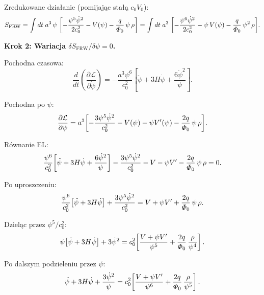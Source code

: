 Zredukowane dzia\l{}anie (pomijaj\k{a}c sta\l{}\k{a} $c_0 V_0$):
\begin{equation}\label{eq:S-FRW-reduced}
  S_{\mathrm{FRW}}
  = \int dt\;a^3\,\psi\;\biggl[
    -\frac{\psi^5\dot\psi^2}{2c_0^2}
    - V(\psi)
    - \frac{q}{\varPhi_0}\,\psi\,\rho
  \biggr]
  = \int dt\;a^3\;\biggl[
    -\frac{\psi^6\dot\psi^2}{2c_0^2}
    - \psi\,V(\psi)
    - \frac{q}{\varPhi_0}\,\psi^2\,\rho
  \biggr].
\end{equation}

\textbf{Krok 2: Wariacja $\delta S_{\mathrm{FRW}}/\delta\psi = 0$.}

Pochodna czasowa:
\begin{equation}\label{eq:ddt-pdotpsi}
  \frac{d}{dt}\!\left(\frac{\partial\mathcal{L}}{\partial\dot\psi}\right)
  = -\frac{a^3\psi^6}{c_0^2}
  \left[\ddot\psi + 3H\dot\psi + \frac{6\dot\psi^2}{\psi}\right].
\end{equation}

Pochodna po $\psi$:
\begin{equation}\label{eq:dpsi-direct}
  \frac{\partial\mathcal{L}}{\partial\psi}
  = a^3\biggl[
    -\frac{3\psi^5\dot\psi^2}{c_0^2}
    - V(\psi) - \psi V'(\psi)
    - \frac{2q}{\varPhi_0}\,\psi\,\rho
  \biggr].
\end{equation}

R\'ownanie EL:
\begin{equation}\label{eq:EL-FRW-full}
  \frac{\psi^6}{c_0^2}\!\left[\ddot\psi + 3H\dot\psi
    + \frac{6\dot\psi^2}{\psi}\right]
  - \frac{3\psi^5\dot\psi^2}{c_0^2}
  - V - \psi V'
  - \frac{2q}{\varPhi_0}\,\psi\,\rho
  = 0.
\end{equation}

Po uproszczeniu:
\begin{equation}\label{eq:EL-FRW-simplified}
  \frac{\psi^6}{c_0^2}\!\left[\ddot\psi + 3H\dot\psi\right]
  + \frac{3\psi^5\dot\psi^2}{c_0^2}
  = V + \psi V'
  + \frac{2q}{\varPhi_0}\,\psi\,\rho.
\end{equation}

Dziel\k{a}c przez $\psi^5/c_0^2$:
\begin{equation}\label{eq:EL-FRW-divided}
  \psi\!\left[\ddot\psi + 3H\dot\psi\right]
  + 3\dot\psi^2
  = c_0^2\!\left[
    \frac{V + \psi V'}{\psi^5}
    + \frac{2q}{\varPhi_0}\,\frac{\rho}{\psi^4}
  \right].
\end{equation}

Po dalszym podzieleniu przez $\psi$:
\begin{equation}\label{eq:psi-eq-unified}
  \ddot\psi + 3H\dot\psi + \frac{3\dot\psi^2}{\psi}
  = c_0^2\!\left[
    \frac{V + \psi V'}{\psi^6}
    + \frac{2q}{\varPhi_0}\,\frac{\rho}{\psi^5}
  \right].
\end{equation}

